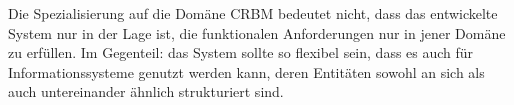 Die Spezialisierung auf die Domäne CRBM bedeutet nicht, dass das entwickelte System nur in der Lage ist, die funktionalen Anforderungen nur in jener Domäne zu erfüllen. Im Gegenteil: das System sollte so flexibel sein, dass es auch für Informationssysteme genutzt werden kann, deren Entitäten sowohl an sich als auch untereinander ähnlich strukturiert sind.
